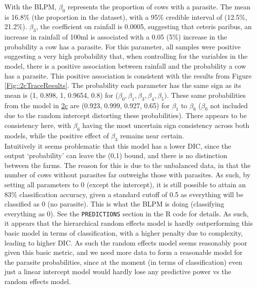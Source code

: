 \documentclass[11pt]{article}
\begin{document}
With the BLPM, $\beta_0$ represents the proportion of cows with a parasite. The mean is 16.8\% (the proportion in the dataset), with a 95\% credible interval of (12.5\%, 21.2\%). $\beta_3$, the coefficient on rainfall is 0.0005, suggesting that ceteris paribus, an increase in rainfall of 100ml is associated with a 0.05 (5\%) increase in the probability a cow has a parasite. For this parameter, all samples were positive suggesting a very high probability that, when controlling for the variables in the model, there is a positive association between rainfall and the probability a cow has a parasite. This positive association is consistent with the results from Figure \ref{Fig::2cTraceResults}. The probability each parameter has the same sign as its mean is (1, 0.898, 1, 0.9654, 0.8) for ($\beta_0, \beta_1, \beta_3, \beta_4, \beta_5)$. These same probabilities from the model in \hyperref[sec::2c]{2c} are (0.923, 0.999, 0.927, 0.65) for $\beta_1$ to $\beta_6$ ($\beta_0$ not included due to the random intercept distorting these probabilities). There appears to be consistency here, with $\beta_6$ having the most uncertain sign consistency across both models, while the positive effect of $\beta_3$ remains near certain. \\
Intuitively it seems problematic that this model has a lower DIC, since the output `probability' can leave the (0,1) bound, and there is no distinction between the farms. The reason for this is due to the unbalanced data, in that the number of cows without parasites far outweighs those with parasites. As such, by setting all parameters to 0 (except the intercept), it is still possible to attain an 83\% classification accuracy, given a standard cutoff of 0.5 as everything will be classified as 0 (no parasite). This is what the BLPM is doing (classifying everything as 0). See the \texttt{PREDICTIONS} section in the R code for details. As such, it appears that the hierarchical random effects model is hardly outperforming this basic model in terms of classification, with a higher penalty due to complexity, leading to higher DIC. As such the random effects model seems reasonably poor given this basic metric, and we need more data to form a reasonable model for the parasite probabilities, since at the moment (in terms of classification) even just a linear intercept model would hardly lose any predictive power vs the random effects model.  


\end{document}
